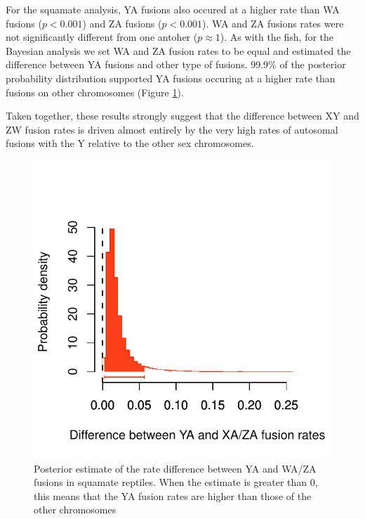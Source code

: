 \documentclass[12pt,twoside]{article}
\begin{document}
For the squamate analysis, YA fusions also occured at a higher rate than WA fusions ($p<\text{0.001}$) and ZA fusions ($p<\text{0.001}$). WA and ZA fusions rates were not significantly different from one antoher ($p\approx \text{1}$). As with the fish, for the Bayesian analysis we set WA and ZA fusion rates to be equal and estimated the difference between YA fusions and other type of fusions. 99.9\% of the posterior probability distribution supported YA fusions occuring at a higher rate than fusions on other chromosomes (Figure \ref{fig:squa-ind}). 

Taken together, these results strongly suggest that the difference between XY and ZW fusion rates is driven almost entirely by the very high rates of autosomal fusions with the Y relative to the other sex chromosomes.

\begin{figure}[p]
\centering
\includegraphics[scale=1.25]{figs/chromosome-fusion-squa}
\caption{Posterior estimate of the rate difference between YA and WA/ZA fusions in squamate reptiles. When the estimate is greater than 0, this means that the YA fusion rates are higher than those of the other chromosomes}
\label{fig:squa-ind}
\end{figure}

\clearpage


\end{document}
